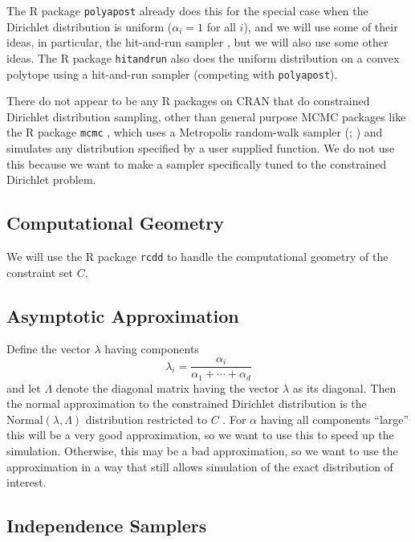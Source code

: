 \documentclass[11pt]{article}
\begin{document}
The R package \texttt{polyapost} \citep{polyapost} already does this
for the special case when the Dirichlet distribution is uniform
($\alpha_i = 1$ for all $i$), and we will use some
of their ideas, in particular, the hit-and-run sampler
\citep*{smith,hit-run-one,hit-run-two}, but we will also use some other ideas.
The R package \texttt{hitandrun} \citep{hitandrun}
also does the uniform distribution on a
convex polytope using a hit-and-run sampler (competing with \texttt{polyapost}).

There do not appear to be any R packages on CRAN that do constrained Dirichlet
distribution sampling, other than general purpose MCMC packages like
the R package \texttt{mcmc} \citep{mcmc}, which uses a Metropolis
random-walk sampler (\citealp{metropolis-et-al};
\citealp[Section~2.3.2]{tierney})
and simulates any distribution specified by a user
supplied function.  We do not use this because we want to make a sampler
specifically tuned to the constrained Dirichlet problem.

\subsection{Computational Geometry}

We will use the R package \texttt{rcdd} \citep*{rcdd} to handle
the computational geometry of the constraint set $C$.

\subsection{Asymptotic Approximation}

Define the vector $\lambda$ having components
\begin{equation} \label{eq:lambda}
   \lambda_i = \frac{\alpha_i}{\alpha_1 + \cdots + \alpha_d}
\end{equation}
and let $\Lambda$ denote the diagonal matrix having the vector $\lambda$
as its diagonal.  Then the normal approximation to the constrained
Dirichlet distribution is
the $\text{Normal}(\lambda, \Lambda)$ distribution
restricted to $C$ \citep[Theorem~4.2]{geyer-meeden}.  For $\alpha$ having
all components ``large'' this will be a very good approximation, so we want
to use this to speed up the simulation.  Otherwise, this may be a bad
approximation, so we want to use the approximation in a way that still
allows simulation of the exact distribution of interest.

\subsection{Independence Samplers}
\end{document}
